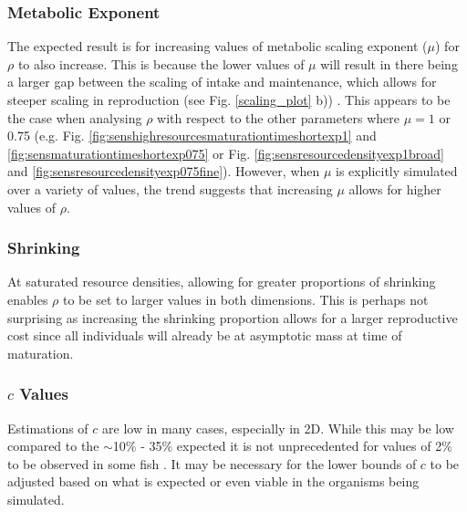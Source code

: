 \documentclass[a4paper, 11pt, hidelinks]{article} %
\begin{document}
	\subsubsection{Metabolic Exponent}
	The expected result is for increasing values of metabolic scaling exponent ($\mu$) for $\rho$ to also increase.  This is because the lower values of $\mu$ will result in there being a larger gap between the scaling of intake and maintenance, which allows for steeper scaling in reproduction (see Fig. \ref{scaling_plot} b)) \parencite{Marshall2019}.  This appears to be the case when analysing $\rho$ with respect to the other parameters where $\mu = 1$ or 0.75 (e.g. Fig. \ref{fig:senshighresourcesmaturationtimeshortexp1} and \ref{fig:sensmaturationtimeshortexp075} or Fig. \ref{fig:sensresourcedensityexp1broad} and \ref{fig:sensresourcedensityexp075fine}).  However, when $\mu$ is explicitly simulated over a variety of values, the trend suggests that increasing $\mu$ allows for higher values of $\rho$.  
	
	\subsubsection{Shrinking}
	At saturated resource densities, allowing for greater proportions of shrinking enables $\rho$ to be set to larger values in both dimensions.  This is perhaps not surprising as increasing the shrinking proportion allows for a larger reproductive cost since all individuals will already be at asymptotic mass at time of maturation.
	
	\subsubsection{$c$ Values}
	Estimations of $c$ are low in many cases, especially in 2D.  While this may be low compared to the $\sim$10\% - 35\% expected \parencite{Benoit2018, Fontoura2009, Roff1983} it is not unprecedented for values of 2\% to be observed in some fish \parencite{Gunderson1997}.  It may be necessary for the lower bounds of $c$ to be adjusted based on what is expected or even viable in the organisms being simulated.
	
\end{document}
